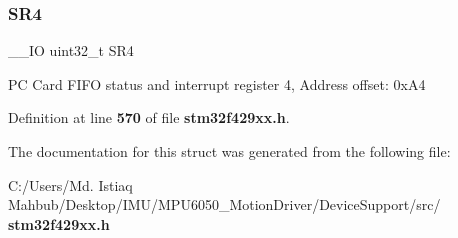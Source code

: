 \mbox{\label{structFMC__Bank4__TypeDef_a8218d6e11dae5d4468c69303dec0b4fc}} 
\subsubsection{S\+R4}
{\footnotesize\ttfamily \+\_\+\+\_\+\+IO uint32\+\_\+t S\+R4}

PC Card F\+I\+FO status and interrupt register 4, Address offset\+: 0x\+A4 

Definition at line \textbf{ 570} of file \textbf{ stm32f429xx.\+h}.



The documentation for this struct was generated from the following file\+:\begin{DoxyCompactItemize}
\item 
C\+:/\+Users/\+Md. Istiaq Mahbub/\+Desktop/\+I\+M\+U/\+M\+P\+U6050\+\_\+\+Motion\+Driver/\+Device\+Support/src/\textbf{ stm32f429xx.\+h}\end{DoxyCompactItemize}
